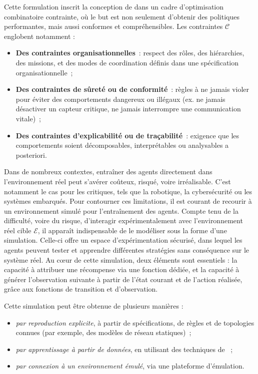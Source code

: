 \noindent
Cette formulation inscrit la conception de  dans un cadre d'optimisation combinatoire contrainte, où le but est non seulement d'obtenir des politiques performantes, mais aussi conformes et compréhensibles.
%
Les contraintes $\mathcal{C}$ englobent notamment :
\begin{itemize}
  \item \textbf{Des contraintes organisationnelles}~: respect des rôles, des hiérarchies, des missions, et des modes de coordination définis dans une spécification organisationnelle~;
  \item \textbf{Des contraintes de sûreté ou de conformité}~: règles à ne jamais violer pour éviter des comportements dangereux ou illégaux (ex. ne jamais désactiver un capteur critique, ne jamais interrompre une communication vitale)~;
  \item \textbf{Des contraintes d'explicabilité ou de traçabilité}~: exigence que les comportements soient décomposables, interprétables ou analysables a posteriori.
\end{itemize}

Dans de nombreux contextes, entraîner des agents directement dans l'environnement réel peut s'avérer coûteux, risqué, voire irréalisable. C'est notamment le cas pour les  critiques, tels que la robotique, la cybersécurité ou les systèmes embarqués. Pour contourner ces limitations, il est courant de recourir à un environnement simulé pour l'entraînement des agents. Compte tenu de la difficulté, voire du risque, d'interagir expérimentalement avec l'environnement réel cible $\mathcal{E}$, il apparaît indispensable de le modéliser sous la forme d'une simulation. Celle-ci offre un espace d'expérimentation sécurisé, dans lequel les agents peuvent tester et apprendre différentes stratégies sans conséquence sur le système réel. Au cœur de cette simulation, deux éléments sont essentiels : la capacité à attribuer une récompense via une fonction dédiée, et la capacité à générer l'observation suivante à partir de l'état courant et de l'action réalisée, grâce aux fonctions de transition et d'observation.


Cette simulation peut être obtenue de plusieurs manières :
\begin{itemize}
  \item \emph{par reproduction explicite}, à partir de spécifications, de règles et de topologies connues (par exemple, des modèles de réseau statiques)~;
  \item \emph{par apprentissage à partir de données}, en utilisant des techniques de ~;
  \item \emph{par connexion à un environnement émulé}, via une plateforme d'émulation.
\end{itemize}

